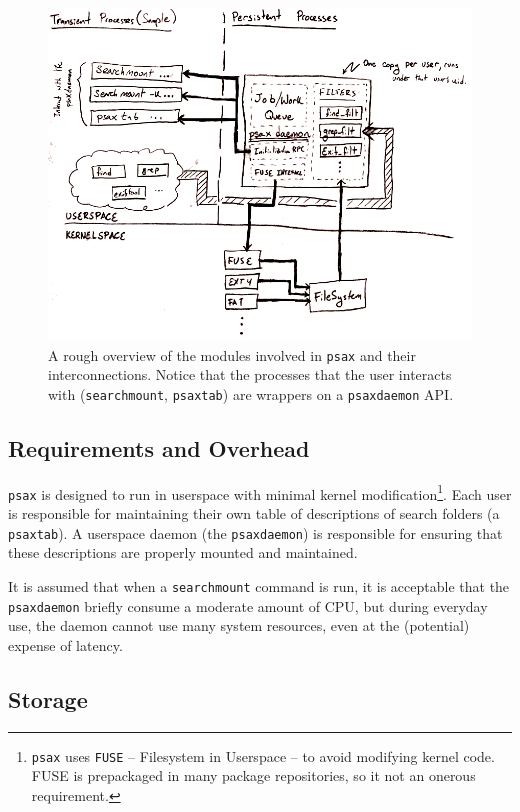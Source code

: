 \documentclass[a4paper]{report}
\newcommand{\inlinecode}{\texttt}
\begin{document}
\begin{figure}[h!]
  \centering
  \includegraphics[width=1.0\textwidth]{image}
  \caption{A rough overview of the modules involved in \inlinecode{psax} and their interconnections. Notice that the processes that the user interacts with (\inlinecode{searchmount}, \inlinecode{psaxtab}) are wrappers on a \inlinecode{psaxdaemon} API.}
\end{figure}

\subsection{Requirements and Overhead}

\inlinecode{psax} is designed to run in userspace with minimal kernel modification\footnote{\inlinecode{psax} uses \inlinecode{FUSE} -- Filesystem in Userspace -- to avoid modifying kernel code. FUSE is prepackaged in many package repositories, so it not an onerous requirement.}. Each user is responsible for maintaining their own table of descriptions of search folders (a \inlinecode{psaxtab}). A userspace daemon (the \inlinecode{psaxdaemon}) is responsible for ensuring that these descriptions are properly mounted and maintained.

It is assumed that when a \inlinecode{searchmount} command is run, it is acceptable that the \inlinecode{psaxdaemon} briefly consume a moderate amount of CPU, but during everyday use, the daemon cannot use many system resources, even at the (potential) expense of latency.

\subsection{Storage}
\end{document}

